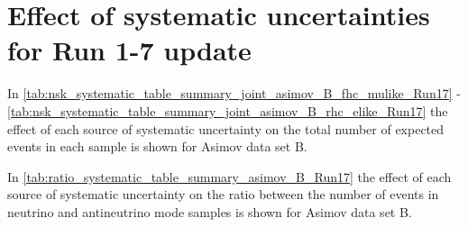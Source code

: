 
%
%

\section{Effect of systematic uncertainties for Run 1-7 update}
\label{app:systematics_run17}


In \cref{tab:nsk_systematic_table_summary_joint_asimov_B_fhc_mulike_Run17} - 
\ref{tab:nsk_systematic_table_summary_joint_asimov_B_rhc_elike_Run17}
the effect of each source of systematic uncertainty on the total number of expected events in each sample is shown
for Asimov data set B.

In \cref{tab:ratio_systematic_table_summary_asimov_B_Run17} 
the effect of each source of systematic uncertainty on the ratio between the number of events in 
neutrino and antineutrino mode samples is shown for Asimov data set B.




\clearpage






